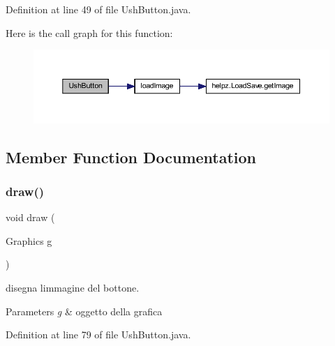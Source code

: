Definition at line 49 of file Ush\+Button.\+java.

Here is the call graph for this function\+:\nopagebreak
\begin{figure}[H]
\begin{center}
\leavevmode
\includegraphics[width=350pt]{classui_1_1_ush_button_a897b1e73322d3db9ffb350034fbff99e_cgraph}
\end{center}
\end{figure}


\subsection{Member Function Documentation}
\mbox{\label{classui_1_1_ush_button_a72fe1ffca978e99fd16994a10e7f8051}} 
\subsubsection{\texorpdfstring{draw()}{draw()}}
{\footnotesize\ttfamily void draw (\begin{DoxyParamCaption}\item[{Graphics}]{g }\end{DoxyParamCaption})}



disegna l\textquotesingle{}immagine del bottone. 


\begin{DoxyParams}{Parameters}
{\em g} & oggetto della grafica \\
\hline
\end{DoxyParams}


Definition at line 79 of file Ush\+Button.\+java.

